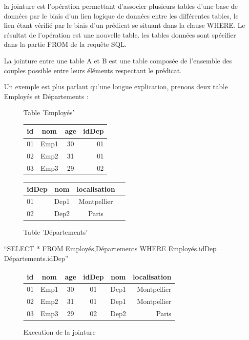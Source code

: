 \documentclass[oneside,13pt,a4paper]{report}
\begin{document}
la jointure est l'opération permettant d’associer plusieurs tables d'une base de données par le biais d’un lien logique de données entre les différentes tables,
le lien étant vérifié par le biais d'un prédicat se situant dans la clause WHERE. Le résultat de l'opération est une nouvelle table.
les tables données sont spécifier dans la partie FROM de la requête SQL.

La jointure entre une table A et B est une table composée de l'ensemble des couples possible entre leurs éléments respectant le prédicat.

Un exemple est plus parlant qu'une longue explication, prenons deux table Employés et Départements :

\begin{figure}[h]
	\begin{minipage}[c]{.46\linewidth}
		\centering
		\caption{Table 'Employés'}
		\begin{tabular}{|l|c|c|r|}
			\hline
			id   & nom  & age & idDep
			\\
			\hline
			01 & Emp1 &  30  & 01 \\
			02 & Emp2 &  31  & 01 \\
			03 & Emp3 &  29  & 02 \\
			\hline
		\end{tabular}
	\end{minipage}
	\hfill%
	\begin{minipage}[c]{.46\linewidth}
		\centering
		\caption{Table 'Départements'}
		\begin{tabular}{|l|c|c|r|}
			\hline
			idDep   & nom   & localisation
			\\
			\hline
			01 & Dep1 &  Montpellier  \\
			02 & Dep2 &  Paris  \\
			\hline
		\end{tabular}
	\end{minipage}
\end{figure}

	\enquote{SELECT * FROM Employés,Départements WHERE Employés.idDep = Départements.idDep}

\begin{figure}[h]
		\centering
		\caption{Execution de la jointure}
		\begin{tabular}{|l|c|c|c|c|r|}
			\hline
			id   & nom  & age & idDep & nom   & localisation
			\\
			\hline
			01 & Emp1 &  30  & 01 & Dep1 &  Montpellier \\
			02 & Emp2 &  31  & 01 & Dep1 &  Montpellier \\
			03 & Emp3 &  29  & 02 & Dep2 &  Paris \\
			\hline
		\end{tabular}
\end{figure}
\end{document}
